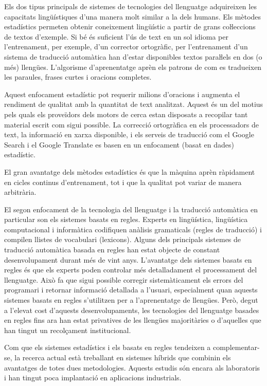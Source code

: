 \begin{multicols}{2}
Els dos tipus principals de sistemes de tecnologies del llenguatge adquireixen les capacitats lingüístiques d’una manera molt similar a la dels humans. Els mètodes estadístics permeten obtenir coneixement lingüístic a partir de grans coŀleccions de textos d’exemple. Si bé és suficient l'ús de text en un sol idioma per l’entrenament, per exemple, d'un corrector ortogràfic, per l’entrenament d'un sistema de traducció automàtica han d'estar disponibles textos paraŀlels en dos (o més) llengües. L'algorisme d'aprenentatge aprèn els patrons de com es tradueixen les paraules, frases curtes i oracions completes.

Aquest enfocament estadístic pot requerir milions d'oracions i augmenta el rendiment de qualitat amb la quantitat de text analitzat. Aquest és un del motius pels quals els proveïdors dels motors de cerca estan disposats a recopilar tant material escrit com sigui possible. La correcció ortogràfica en els processadors de text, la informació en xarxa disponible, i els serveis de traducció com el Google Search i el Google Translate es basen en un enfocament (basat en dades) estadístic.   

El gran avantatge dels mètodes estadístics és que la màquina aprèn ràpidament en cicles continus d’entrenament, tot i que la qualitat pot variar de manera arbitrària.

El segon enfocament de la tecnologia del llenguatge i la traducció automàtica en particular son els sistemes basats en regles. Experts en lingüística, lingüística computacional i informàtica codifiquen anàlisis gramaticals (regles de traducció) i compilen llistes de vocabulari (lexicons). Alguns dels principals sistemes de traducció automàtica basada en regles han estat objecte de constant desenvolupament durant més de vint anys. L’avantatge dels sistemes basats en regles és que els experts poden controlar més detalladament el processament del llenguatge. Això fa que sigui possible corregir sistemàticament els errors del programari i retornar informació detallada a l’usuari, especialment quan aquests sistemes basats en regles s’utilitzen per a l’aprenentatge de llengües. Però, degut a l'elevat cost d'aquests desenvolupaments, les tecnologies del llenguatge basades en regles fins ara han estat privatives de les llengües majoritàries o d'aquelles que han tingut un recolçament institucional.

	Com que els sistemes estadístics i els basats en regles tendeixen a complementar-se, la recerca actual està treballant en sistemes híbrids que combinin els avantatges de totes dues metodologies. Aquests estudis són encara als laboratoris i han tingut poca implantació en aplicacions industrials.
	

\end{multicols}
